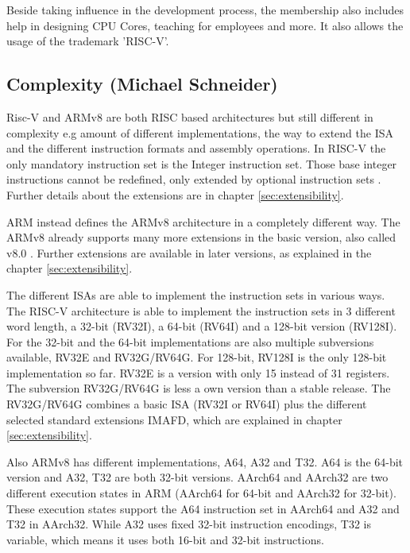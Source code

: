 \documentclass[conference]{IEEEtran}
\begin{document}
	Beside taking influence in the development process, the membership also includes help in designing \gls{CPU} Cores, teaching for employees and more. It also allows the usage of the trademark 'RISC-V'.

	\subsection{Complexity (Michael Schneider)}
	\label{complexity}
	Risc-V and ARMv8 are both \gls{RISC} based architectures but still different in complexity e.g amount of different implementations, the way to extend the \gls{ISA} and the different instruction formats and assembly operations. In RISC-V the only mandatory instruction set is the Integer instruction set. Those base integer instructions cannot be redefined, only extended by optional instruction sets \cite[page 3f]{Waterman2017}. Further details about the extensions are in chapter \ref{sec:extensibility}.
	
	ARM instead defines the ARMv8 architecture in a completely different way. The ARMv8 already supports many more extensions in the basic version, also called v8.0 \cite[page 60]{Arm2020}. Further extensions are available in later versions, as explained in the chapter \ref{sec:extensibility}.	

	The different \glspl{ISA} are able to implement the instruction sets in various ways.
	The RISC-V architecture is able to implement the instruction sets in 3 different word length, a 32-bit (RV32I), a 64-bit (RV64I) and a 128-bit version (RV128I).
	For the 32-bit and the 64-bit implementations are also multiple subversions available, RV32E and RV32G/RV64G. For 128-bit, RV128I is the only 128-bit implementation so far. RV32E is a version with only 15 instead of 31 registers. The subversion RV32G/RV64G is less a own version than a stable release. The RV32G/RV64G combines a basic \gls{ISA} (RV32I or RV64I) plus the different selected standard extensions IMAFD, which are explained in chapter \ref{sec:extensibility}. \cite[page 3ff]{Waterman2017} 

	Also ARMv8 has different implementations, A64, A32 and T32. A64 is the 64-bit version and A32, T32  are both 32-bit versions.
	AArch64 and AArch32 are two different execution states in ARM (AArch64 for 64-bit and AArch32 for 32-bit). These execution states support the A64 instruction set in AArch64 and A32 and T32 in AArch32. While A32 uses fixed 32-bit instruction encodings, T32 is variable, which means it uses both 16-bit and 32-bit instructions. \cite[page 38]{Arm2020}
	
\end{document}
